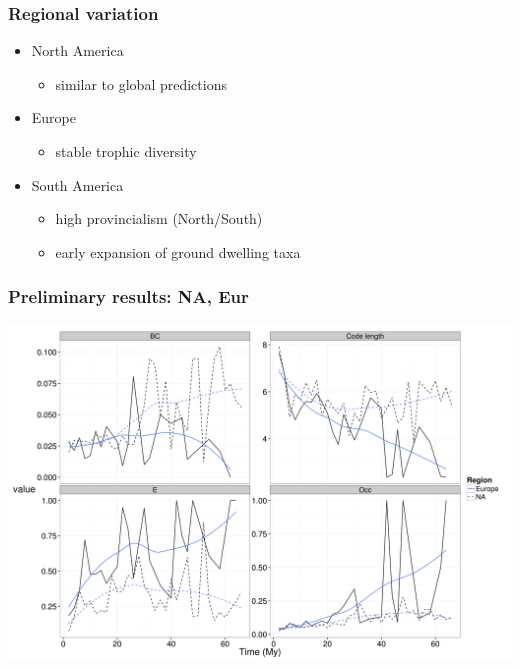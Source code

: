 \documentclass{beamer}
\begin{document}
\begin{frame}
  \frametitle{Regional variation} 

  \begin{itemize}
    \item North America
      \begin{itemize}
        \item similar to global predictions
      \end{itemize}
    \item Europe
      \begin{itemize}
        \item stable trophic diversity
      \end{itemize}
    \item South America
      \begin{itemize}
        \item high provincialism (North/South)
        \item early expansion of ground dwelling taxa
      \end{itemize}
  \end{itemize}
\end{frame}

\begin{frame}
  \frametitle{Preliminary results: NA, Eur}

  \begin{center}
    \includegraphics[height = 0.8\textheight, width = \textwidth, keepaspectratio = true]{figure/gen_bin}
  \end{center}
\end{frame}
\end{document}
